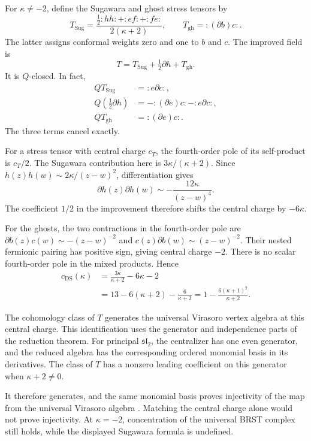 For $\kappa\ne-2$, define the Sugawara and ghost stress tensors by
\[
 T_{\mathrm{Sug}}
 =\frac{\tfrac12:hh:+:ef:+:fe:}{2(\kappa+2)},
 \qquad T_{\mathrm{gh}}=:(\partial b)c:.
\]
The latter assigns conformal weights zero and one to $b$ and $c$.
The improved field is
\[
 T=T_{\mathrm{Sug}}+\tfrac12\partial h+T_{\mathrm{gh}}.
\]
It is $Q$-closed.  In fact,
\begin{align*}
 QT_{\mathrm{Sug}}&=:e\partial c:,\\
 Q(\tfrac12\partial h)&=-:(\partial e)c:-:e\partial c:,\\
 QT_{\mathrm{gh}}&=:(\partial e)c:.
\end{align*}
The three terms cancel exactly.

For a stress tensor with central charge $c_T$, the fourth-order
pole of its self-product is $c_T/2$.
The Sugawara contribution here is $3\kappa/(\kappa+2)$.
Since $h(z)h(w)\sim2\kappa/(z-w)^2$, differentiation gives
\[
 \partial h(z)\partial h(w)\sim
 -\frac{12\kappa}{(z-w)^4}.
\]
The coefficient $1/2$ in the improvement therefore shifts the
central charge by $-6\kappa$.

For the ghosts, the two contractions in the fourth-order pole are
$\partial b(z)c(w)\sim-(z-w)^{-2}$ and
$c(z)\partial b(w)\sim(z-w)^{-2}$.
Their nested fermionic pairing has positive sign, giving
central charge $-2$.
There is no scalar fourth-order pole in the mixed products.
Hence
\begin{align*}
 c_{\mathrm{DS}}(\kappa)
 &=\frac{3\kappa}{\kappa+2}-6\kappa-2\\
 &=13-6(\kappa+2)-\frac6{\kappa+2}
 =1-\frac{6(\kappa+1)^2}{\kappa+2}.
\end{align*}

The cohomology class of $T$ generates the universal Virasoro
vertex algebra at this central charge.
This identification uses the generator and independence parts
of the reduction theorem.
For principal $\mathfrak{sl}_2$, the centralizer has one even
generator, and the reduced algebra has the corresponding
ordered monomial basis in its derivatives.
The class of $T$ has a nonzero leading coefficient on this
generator when $\kappa+2\ne0$.

It therefore generates, and the same monomial basis proves
injectivity of the map from the universal Virasoro algebra
\cite[Theorems 4.1 and 5.1(b)]{KacWakimoto2004}.
Matching the central charge alone would not prove injectivity.
At $\kappa=-2$, concentration of the universal BRST complex
still holds, while the displayed Sugawara formula is undefined.

